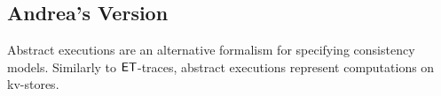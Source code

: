 \subsection{Andrea's Version}
Abstract executions \cite{ev_transactions,framework-concur} are an alternative formalism for specifying consistency models. 
Similarly to $\mathsf{ET}$-traces, abstract executions represent computations on kv-stores.
 

%

